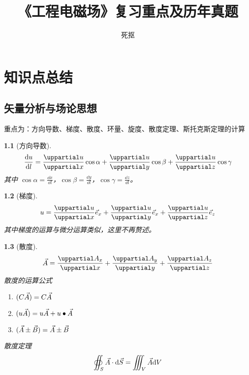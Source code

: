 \documentclass{book}
\title{《工程电磁场》复习重点及历年真题}
\author{死抠}
\theoremstyle{change}
\newtheorem{ti}{}[section]
\let\div\relax\let\grad\relax
\DeclareMathOperator{\div}{div}
\DeclareMathOperator{\grad}{grad}
\def\partial{\uppartial}
\begin{document}
\frontmatter
\maketitle
\tableofcontents
\mainmatter
\chapter{知识点总结}
\section{矢量分析与场论思想}
\raggedright 重点为：方向导数、梯度、散度、环量、旋度、散度定理、斯托克斯定理的计算
\begin{ti}[方向导数]
	\[
		\frac{\dd u}{\dd l}=\frac{\partial u}{\partial x}\cos \alpha+\frac{\partial u}{\partial y}\cos \beta+\frac{\partial u}{\partial z}\cos \gamma
	\]
	其中 $\cos \alpha=\frac{\dd x}{\dd l}$，$\cos \beta=\frac{\dd y}{\dd l}$，$\cos \gamma=\frac{\dd z}{\dd l}$。
\end{ti}

\begin{ti}[梯度]
	\[
		\grad u=\frac{\partial u}{\partial x}\vec e_x+\frac{\partial u}{\partial y}\vec e_x+\frac{\partial u}{\partial z}\vec e_z
	\]
	其中梯度的运算与微分运算类似，这里不再赘述。
\end{ti}

\begin{ti}[散度]
	\[
		\div\vec A=\frac{\partial A_x}{\partial x}+\frac{\partial A_y}{\partial y}+\frac{\partial A_z}{\partial z}
	\]
	散度的运算公式
	\begin{enumerate}
		\item $\div(C\vec{A})=C\div\vec{A}$
		\item $\div(u\vec{A})=u\div\vec{A}+\grad u\bullet\vec{A}$
		\item $\div(\vec{A}\pm\vec{B})=\div\vec{A}\pm\div\vec{B}$
	\end{enumerate}
	散度定理
	\[
		\oiint_{S}{\vec{A}\cdot\dd \vec{S}}=\iiint_{V}{\div\vec{A}\dd V}
	\]
\end{ti}
\end{document}
